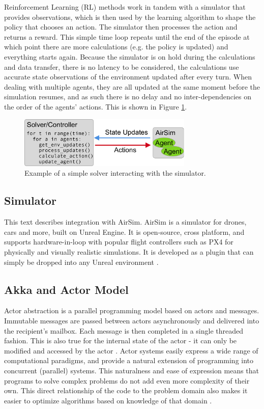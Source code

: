 \documentclass{article}
\let\cite\citep
\begin{document}
Reinforcement Learning (RL) methods work in tandem with a simulator that provides observations, which is then used by the learning algorithm to shape the policy that chooses an action. The simulator then processes the action and returns a reward. This simple time loop repeats until the end of the episode at which point there are more calculations (e.g. the policy is updated) and everything starts again. Because the simulator is on hold during the calculations and data transfer, there is no latency to be considered, the calculations use accurate state observations of the environment updated after every turn. When dealing with multiple agents, they are all updated at the same moment before the simulation resumes, and as such there is no delay and no inter-dependencies on the order of the agents' actions. This is shown in Figure \ref{fig:naive-solver}.

\begin{figure}[h]
	\centering
	\includegraphics[width=8.31cm]{naive-solver}
	\caption{Example of a simple solver interacting with the simulator.}\label{fig:naive-solver}
\end{figure}

\subsection{Simulator}

This text describes integration with AirSim. AirSim is a simulator for drones, cars and more, built on Unreal Engine. It is open-source, cross platform, and supports hardware-in-loop with popular flight controllers such as PX4 for physically and visually realistic simulations. It is developed as a plugin that can simply be dropped into any Unreal environment \cite{shah2018airsim}. 

\subsection{Akka and Actor Model}
Actor abstraction is a parallel programming model based on actors and messages. Immutable messages are passed between actors asynchronously and delivered into the recipient's mailbox. Each message is then completed in a single threaded fashion. This is also true for the internal state of the actor - it can only be modified and accessed by the actor \cite{scala-Akka-streams}. Actor systems easily express a wide range of computational paradigms, and provide a natural extension of programming into concurrent (parallel) systems. This naturalness and ease of expression means that programs to solve complex problems do not add even more complexity of their own. This direct relationship of the code to the problem domain also makes it easier to optimize algorithms based on knowledge of that domain \cite{actor-foundation}.
\end{document}
